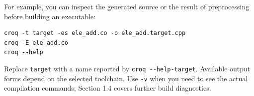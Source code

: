 For example, you can inspect the generated source or the result of preprocessing before building an executable:

\begin{lstlisting}[language={},caption={Inspecting intermediate output and compiler help}]
croq -t target -es ele_add.co -o ele_add.target.cpp
croq -E ele_add.co
croq --help
\end{lstlisting}

Replace \texttt{target} with a name reported by \texttt{croq -\allowbreak{}-\allowbreak{}help-\allowbreak{}target}. Available output forms depend on the selected toolchain. Use \texttt{-v} when you need to see the actual compilation commands; Section 1.4 covers further build diagnostics.
